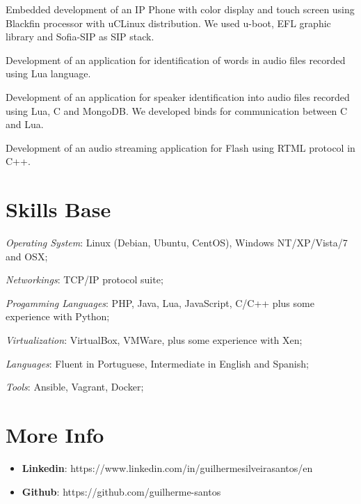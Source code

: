 \documentclass[margin]{res}
\begin{document}
\begin{resume}
Embedded development of an IP Phone with color display and touch screen 
using Blackfin processor with uCLinux distribution. We used u-boot, EFL 
graphic library and Sofia-SIP as SIP stack.

Development of an application for identification of words in audio files 
recorded using Lua language.

Development of an application for speaker identification into audio files 
recorded using Lua, C and MongoDB. We developed binds for 
communication between C and Lua.

Development of an audio streaming application for Flash using RTML 
protocol in C++.
    

\section{Skills Base}  \textit{Operating System}:  Linux (Debian, Ubuntu, CentOS), Windows NT/XP/Vista/7 and OSX;

			\textit{Networkings}: TCP/IP protocol suite;
  
			\textit{Progamming Languages}: PHP, Java, Lua, JavaScript, C/C++ plus some experience with Python;
  
			\textit{Virtualization}: VirtualBox, VMWare, plus some experience with Xen;

			\textit{Languages}: Fluent in Portuguese, Intermediate in English and Spanish;

      \textit{Tools}: Ansible, Vagrant, Docker;
 
\section{More Info}
    \begin{itemize}
        \item \textbf{Linkedin}: https://www.linkedin.com/in/guilhermesilveirasantos/en
         \item \textbf{Github}: https://github.com/guilherme-santos
    \end{itemize}


\end{resume} 
\end{document}
